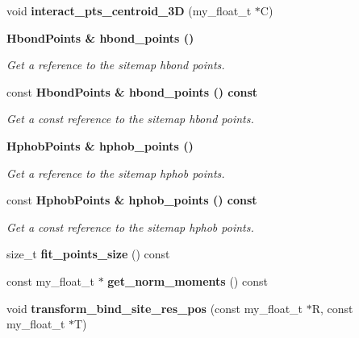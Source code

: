 \begin{CompactItemize}
\item 
void \textbf{interact\_\-pts\_\-centroid\_\-3D} (my\_\-float\_\-t $\ast$C)\label{classSimSite3D_1_1Sitemap_f6ea975d404459e84b1283b3d011434f}

\item 
\bf{Hbond\-Points} \& \bf{hbond\_\-points} ()\label{classSimSite3D_1_1Sitemap_007b084d4422bb7a72bdd63e309985ce}

\begin{CompactList}\small\item\em Get a reference to the sitemap hbond points. \item\end{CompactList}\item 
const \bf{Hbond\-Points} \& \bf{hbond\_\-points} () const \label{classSimSite3D_1_1Sitemap_d985aeaf02eedb866b67eb389e62df52}

\begin{CompactList}\small\item\em Get a const reference to the sitemap hbond points. \item\end{CompactList}\item 
\bf{Hphob\-Points} \& \bf{hphob\_\-points} ()\label{classSimSite3D_1_1Sitemap_ac2a508a7cb5843d2450b4261de23b93}

\begin{CompactList}\small\item\em Get a reference to the sitemap hphob points. \item\end{CompactList}\item 
const \bf{Hphob\-Points} \& \bf{hphob\_\-points} () const \label{classSimSite3D_1_1Sitemap_0ee5530e8852f95876a978e8c284f88f}

\begin{CompactList}\small\item\em Get a const reference to the sitemap hphob points. \item\end{CompactList}\item 
size\_\-t \textbf{fit\_\-points\_\-size} () const \label{classSimSite3D_1_1Sitemap_88f86e7f2f8a1a69a6e34a1b6b942216}

\item 
const my\_\-float\_\-t $\ast$ \textbf{get\_\-norm\_\-moments} () const \label{classSimSite3D_1_1Sitemap_df498664611c91d15cf7234d8ef91dbc}

\item 
void \textbf{transform\_\-bind\_\-site\_\-res\_\-pos} (const my\_\-float\_\-t $\ast$R, const my\_\-float\_\-t $\ast$T)\label{classSimSite3D_1_1Sitemap_22aa833d2798ec1ecc85f29444a60dc2}


\end{CompactItemize}
